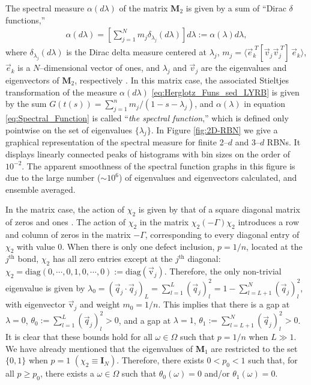 \documentclass[english,12pt,jmp,graphicx]{revtex4-1}
\begin{document}
The spectral measure $\alpha(d\lambda)$ of the matrix $\mathbf{M}_2$ is given by
a sum of ``Dirac $\delta$ functions,''
%
\begin{align}\label{eq:Spectral_Function}
  \alpha(d\lambda)=
    \left[\sum_{j=1}^N m_j \delta_{\lambda_j}(d\lambda)\right]d\lambda
      :=\alpha(\lambda)d\lambda,
\end{align}
%
where $\delta_{\lambda_j}(d\lambda)$ is the Dirac delta measure centered at $\lambda_j$,
$m_j=\langle\vec{e}_k^{\;T}[\vec{v}_j\vec{v}_j^{\;T}]\,\vec{e}_k\rangle$, 
$\vec{e}_k$ is a $N$--dimensional vector of ones, and $\lambda_j$ and
$\vec{v}_j$ are the eigenvalues and eigenvectors of $\mathbf{M}_2$,
respectively \cite{Golden:JoB:337}. In this matrix case, the associated Stieltjes
transformation of the measure $\alpha(d\lambda)$ \eqref{eq:Herglotz_Funs_sed_LYRB} is
given by the sum $G(t(s))=\sum_{j=1}^nm_j/(1-s-\lambda_j)$, and $\alpha(\lambda)$ in equation
\eqref{eq:Spectral_Function} is called ``\emph{the spectral
  function},'' which is defined only pointwise on the set of
eigenvalues $\{\lambda_j\}$. In Figure \ref{fig:2D-RBN} we give a graphical
representation of the spectral measure for finite 2--$d$ and 3--$d$
RBNs. It displays linearly connected peaks of histograms with bin
sizes on the order of $10^{-2}$. The apparent smoothness of the
spectral function graphs in this figure is due to the large number
($\sim10^6$) of eigenvalues and eigenvectors calculated, and ensemble
averaged. 

In the matrix case, the action of $\chi_2$ is given by that of a square
diagonal matrix of zeros and ones \cite{Golden:JoB:337}. The action
of $\chi_2$ in the matrix $\chi_2(-\Gamma)\chi_2$ introduces a row and column
of zeros in the matrix $-\Gamma$, corresponding to every diagonal entry of
$\chi_2$ with value 0. When there is only one defect inclusion, $p=1/n$,
located at the $j^{\text{th}}$ bond, $\chi_2$ has all zero entries except
at the $j^{\text{th}}$ diagonal:
$\chi_2=\text{diag}(0,\cdots,0,1,0,\cdots,0):=\text{diag}(\vec{\text{v}}_j)$. Therefore, 
the only non-trivial eigenvalue is given by 
$\lambda_0=(\vec{q}_j\cdot\vec{q}_j)_L=\sum_{l=1}^L(\vec{q}_j)_l^2=1-\sum_{l=L+1}^N(\vec{q}_j)_l^2$, 
with eigenvector $\vec{\text{v}}_j$ and weight $m_0=1/n$. This  
implies that there is a gap at $\lambda=0$, $\theta_0:=\sum_{l=1}^L(\vec{q}_j)_l^2>0$,
and a gap at $\lambda=1$, $\theta_1:=\sum_{l=L+1}^N(\vec{q}_j)_l^2>0$. It is clear
that these bounds hold for all $\omega\in\Omega$ such that $p=1/n$ when $L\gg1$. We
have already mentioned that the eigenvalues of $\mathbf{M}_1$ are
restricted to the set $\{0,1\}$ when $p=1$
$(\chi_2\equiv\mathbf{I}_N)$. Therefore, there exists $0<p_0<1$ such that,
for all $p\geq p_0$, there exists a $\omega\in\Omega$ such that $\theta_0(\omega)=0$ and/or
$\theta_1(\omega)=0$. %
\end{document}
